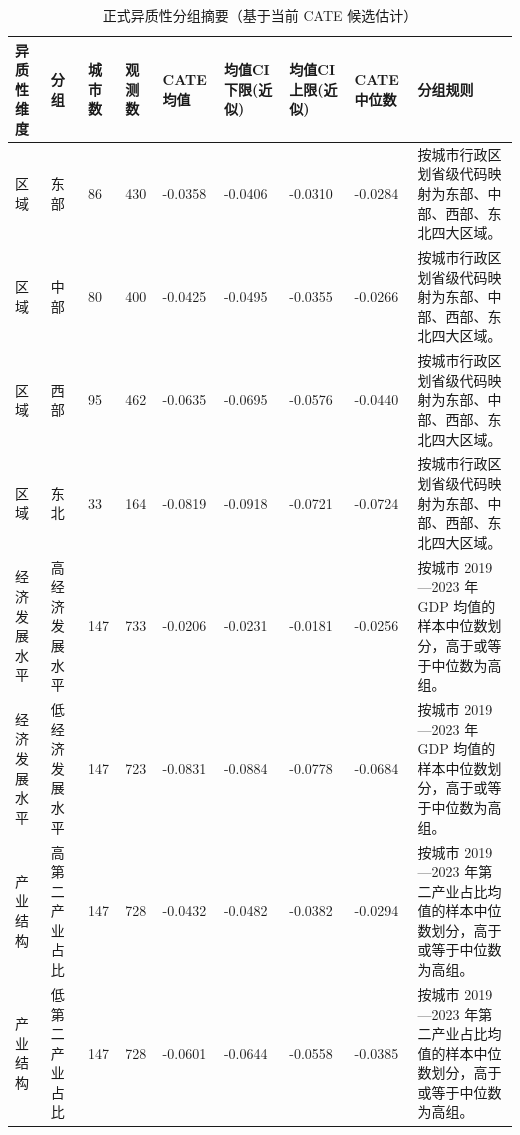 \begin{table}
\caption{正式异质性分组摘要（基于当前 CATE 候选估计）}
\label{tab:heterogeneity_group_summary}
\begin{tabular}{lllllllll}
\toprule
异质性维度 & 分组 & 城市数 & 观测数 & CATE均值 & 均值CI下限(近似) & 均值CI上限(近似) & CATE中位数 & 分组规则 \\
\midrule
区域 & 东部 & 86 & 430 & -0.0358 & -0.0406 & -0.0310 & -0.0284 & 按城市行政区划省级代码映射为东部、中部、西部、东北四大区域。 \\
区域 & 中部 & 80 & 400 & -0.0425 & -0.0495 & -0.0355 & -0.0266 & 按城市行政区划省级代码映射为东部、中部、西部、东北四大区域。 \\
区域 & 西部 & 95 & 462 & -0.0635 & -0.0695 & -0.0576 & -0.0440 & 按城市行政区划省级代码映射为东部、中部、西部、东北四大区域。 \\
区域 & 东北 & 33 & 164 & -0.0819 & -0.0918 & -0.0721 & -0.0724 & 按城市行政区划省级代码映射为东部、中部、西部、东北四大区域。 \\
经济发展水平 & 高经济发展水平 & 147 & 733 & -0.0206 & -0.0231 & -0.0181 & -0.0256 & 按城市 2019—2023 年 GDP 均值的样本中位数划分，高于或等于中位数为高组。 \\
经济发展水平 & 低经济发展水平 & 147 & 723 & -0.0831 & -0.0884 & -0.0778 & -0.0684 & 按城市 2019—2023 年 GDP 均值的样本中位数划分，高于或等于中位数为高组。 \\
产业结构 & 高第二产业占比 & 147 & 728 & -0.0432 & -0.0482 & -0.0382 & -0.0294 & 按城市 2019—2023 年第二产业占比均值的样本中位数划分，高于或等于中位数为高组。 \\
产业结构 & 低第二产业占比 & 147 & 728 & -0.0601 & -0.0644 & -0.0558 & -0.0385 & 按城市 2019—2023 年第二产业占比均值的样本中位数划分，高于或等于中位数为高组。 \\
\bottomrule
\end{tabular}
\end{table}
